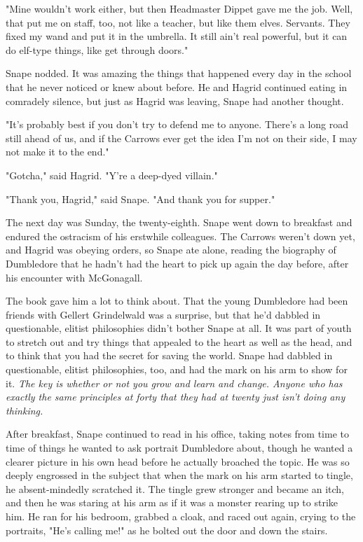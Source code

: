 "Mine wouldn't work either, but then Headmaster Dippet gave me the job. Well, that put me on staff, too, not like a teacher, but like them elves. Servants. They fixed my wand and put it in the umbrella. It still ain't real powerful, but it can do elf-type things, like get through doors."

Snape nodded. It was amazing the things that happened every day in the school that he never noticed or knew about before. He and Hagrid continued eating in comradely silence, but just as Hagrid was leaving, Snape had another thought.

"It's probably best if you don't try to defend me to anyone. There's a long road still ahead of us, and if the Carrows ever get the idea I'm not on their side, I may not make it to the end."

"Gotcha," said Hagrid. "Y're a deep-dyed villain."

"Thank you, Hagrid," said Snape. "And thank you for supper."

The next day was Sunday, the twenty-eighth. Snape went down to breakfast and endured the ostracism of his erstwhile colleagues. The Carrows weren't down yet, and Hagrid was obeying orders, so Snape ate alone, reading the biography of Dumbledore that he hadn't had the heart to pick up again the day before, after his encounter with McGonagall.

The book gave him a lot to think about. That the young Dumbledore had been friends with Gellert Grindelwald was a surprise, but that he'd dabbled in questionable, elitist philosophies didn't bother Snape at all. It was part of youth to stretch out and try things that appealed to the heart as well as the head, and to think that you had the secret for saving the world. Snape had dabbled in questionable, elitist philosophies, too, and had the mark on his arm to show for it. \emph{The key is whether or not you grow and learn and change. Anyone who has exactly the same principles at forty that they had at twenty just isn't doing any thinking.}

After breakfast, Snape continued to read in his office, taking notes from time to time of things he wanted to ask portrait Dumbledore about, though he wanted a clearer picture in his own head before he actually broached the topic. He was so deeply engrossed in the subject that when the mark on his arm started to tingle, he absent-mindedly scratched it. The tingle grew stronger and became an itch, and then he was staring at his arm as if it was a monster rearing up to strike him. He ran for his bedroom, grabbed a cloak, and raced out again, crying to the portraits, "He's calling me!" as he bolted out the door and down the stairs.

